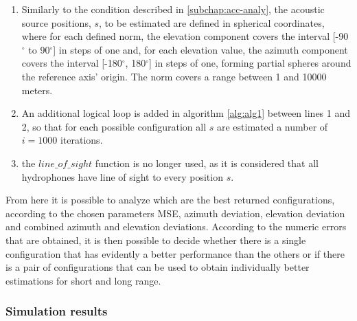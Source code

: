 \begin{enumerate}
	\item Similarly to the condition described in \ref{subchap:acc-analy}, the acoustic source positions, $s$, to be estimated are defined in spherical coordinates, where for each defined norm, the elevation component covers the interval [-90$^{\circ}$ to 90$^{\circ}$] in steps of one and, for each elevation value, the azimuth component covers the interval [-180$^{\circ}$, 180$^{\circ}$] in steps of one, forming partial spheres around the reference axis' origin. The norm covers a range between 1 and 10000 meters.
	
	\item An additional logical loop is added in algorithm \ref{alg:alg1} between lines 1 and 2, so that for each possible configuration all $s$ are estimated a number of $i = 1000$ iterations.
	
	\item the $line\_of\_sight$ function is no longer used, as it is considered that all hydrophones have line of sight to every position $s$.
\end{enumerate}

From here it is possible to analyze which are the best returned configurations, according to the chosen parameters MSE, azimuth deviation, elevation deviation and combined azimuth and elevation deviations. According to the numeric errors that are obtained, it is then possible to decide whether there is a single configuration that has evidently a better performance than the others or if there is a pair of configurations that can be used to obtain individually better estimations for short and long range.

\subsubsection{Simulation results}


